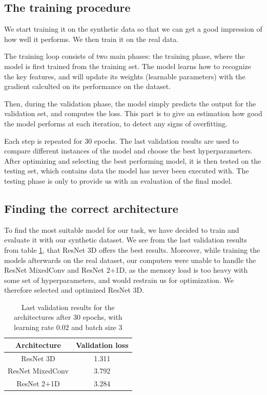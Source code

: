\documentclass[10pt,conference]{IEEEtran}
\begin{document}
\subsection{The training procedure}
We start training it on the synthetic data so that we can get a good impression of how well it performs. We then train it on the real data.\par 
The training loop consists of two main phases: the training phase, where the model is first trained from the training set. The model learns how to recognize the key features, and will update its weights (learnable parameters) with the gradient calculted on its performance on the dataset. \par 
Then, during the validation phase, the model simply predicts the output for the validation set, and computes the loss. This part is to give an estimation how good the model performs at each iteration, to detect any signs of overfitting. \par
Each step is repeated for 30 epochs. The last validation results are used to compare different instances of the model and choose the best hyperparameters. After optimizing and selecting the best performing model, it is then tested on the testing set, which contains data the model has never been executed with. The testing phase is only to provide us with an evaluation of the final model.


\subsection{Finding the correct architecture}
To find the most suitable model for our task, we have decided to train and evaluate it with our synthetic dataset. We see from the last validation results from table \ref{table:comparisonLoss}, that ResNet 3D offers the best results. Moreover, while training the models afterwards on the real dataset, our computers were unable to handle the ResNet MixedConv and ResNet 2+1D, as the memory load is too heavy with some set of hyperparameters, and would restrain us for optimization. We therefore selected and optimized ResNet 3D. 

\begin{table}[h!]
\centering
 \begin{tabular}{|c | c |} 
 \hline
    Architecture & Validation loss \\  
 \hline\hline
    ResNet 3D & 1.311\\ 
 \hline
    ResNet MixedConv & 3.792\\
 \hline
    ResNet 2+1D & 3.284\\
 \hline
\end{tabular}
\caption{Last validation results for the architectures after 30 epochs, with learning rate 0.02 and batch size 3}
\label{table:comparisonLoss}
\end{table}
\end{document}
